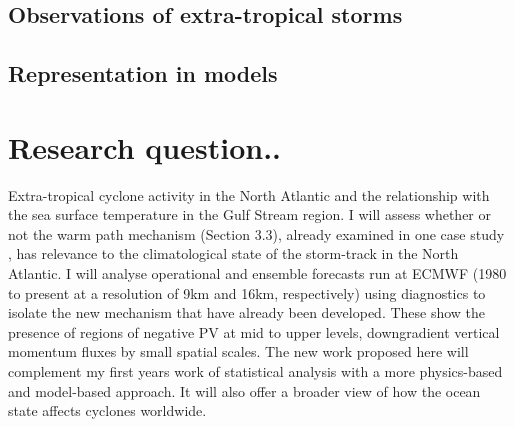 %
%


%
%
%




\subsection{Observations of extra-tropical storms}


\subsection {Representation in models}



\section {Research question..}
Extra-tropical cyclone activity in the North Atlantic and the relationship with the sea surface temperature in the Gulf Stream region. I will assess whether or not the warm path mechanism (Section 3.3), already examined in one case study \cite{sheldon2017warm}, has relevance to the climatological state of the storm-track in the North Atlantic. I will analyse operational and ensemble forecasts run at ECMWF (1980 to present at a resolution of 9km and 16km, respectively) using diagnostics to isolate the new mechanism that have already been developed. These show the presence of regions of negative PV at mid to upper levels, downgradient vertical momentum fluxes by small spatial scales. The new work proposed here will complement my first years work of statistical analysis with a more physics-based and model-based approach. It will also offer a broader view of how the ocean state affects cyclones worldwide. 

